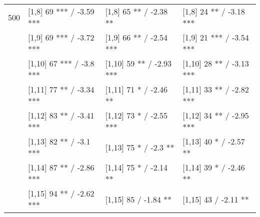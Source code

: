 \begin{table}
\begin{tabular}[t]{llll}
500 & {}[1,8] 69 *** / -3.59 *** & {}[1,8] 65 ** / -2.38 ** & {}[1,8] 24 ** / -3.18 ***\\
 & {}[1,9] 69 *** / -3.72 *** & {}[1,9] 66 ** / -2.54 *** & {}[1,9] 21 *** / -3.54 ***\\
 & {}[1,10] 67 *** / -3.8 *** & {}[1,10] 59 ** / -2.93 *** & {}[1,10] 28 ** / -3.13 ***\\
 & {}[1,11] 77 ** / -3.34 *** & {}[1,11] 71 * / -2.46 ** & {}[1,11] 33 ** / -2.82 ***\\
 & {}[1,12] 83 ** / -3.41 *** & {}[1,12] 73 * / -2.55 *** & {}[1,12] 34 ** / -2.95 ***\\
\addlinespace
 & {}[1,13] 82 ** / -3.1 *** & {}[1,13] 75 * / -2.3 ** & {}[1,13] 40 * / -2.57 **\\
 & {}[1,14] 87 ** / -2.86 *** & {}[1,14] 75 * / -2.14 ** & {}[1,14] 39 * / -2.46 **\\
 & {}[1,15] 94 ** / -2.62 *** & {}[1,15] 85  / -1.84 ** & {}[1,15] 43  / -2.11 **\\
\bottomrule
\end{tabular}
\end{table}
